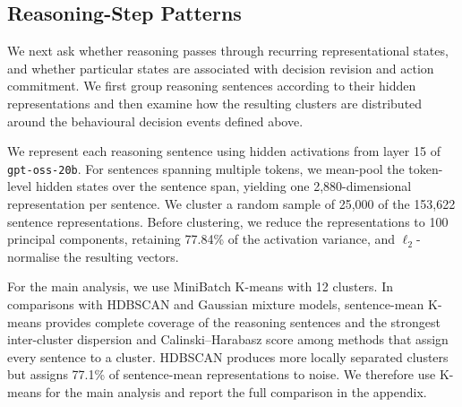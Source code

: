 \documentclass{article}
\begin{document}
\subsection{Reasoning-Step Patterns}
\label{sec:reasoning-patterns}


We next ask whether reasoning passes through recurring representational states,
and whether particular states are associated with decision revision and action
commitment. We first group reasoning sentences according to their hidden
representations and then examine how the resulting clusters are distributed
around the behavioural decision events defined above.

We represent each reasoning sentence using hidden activations from layer 15 of
\texttt{gpt-oss-20b}. For sentences spanning multiple tokens, we mean-pool the
token-level hidden states over the sentence span, yielding one
2,880-dimensional representation per sentence. We cluster a random sample of
25,000 of the 153,622 sentence representations. Before clustering, we reduce
the representations to 100 principal components, retaining 77.84\% of the
activation variance, and $\ell_2$-normalise the resulting vectors.


For the main analysis, we use MiniBatch K-means with 12 clusters. In comparisons
with HDBSCAN and Gaussian mixture models, sentence-mean K-means provides
complete coverage of the reasoning sentences and the strongest inter-cluster
dispersion and Calinski--Harabasz score among methods that assign every
sentence to a cluster. HDBSCAN produces more locally separated clusters but
assigns 77.1\% of sentence-mean representations to noise. We therefore use
K-means for the main analysis and report the full comparison in the appendix.
\end{document}
